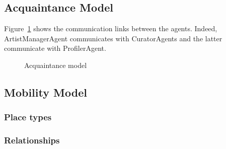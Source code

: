 \documentclass[a4paper,11pt]{report}
\begin{document}
  
  
  \subsection{Acquaintance Model}
  
  Figure~\ref{figure:acquaintance_model} shows the communication links between the agents. 
  Indeed, ArtistManagerAgent communicates with CuratorAgents and the latter communicate with 
  ProfilerAgent.
  
  \begin{figure}[ht!]
\caption{Acquaintance model}
\label{figure:acquaintance_model}
\end{figure}
  
  \subsection{Mobility Model}
  

  \subsubsection{Place types}
  
  \subsubsection{Relationships}
  
\end{document}
